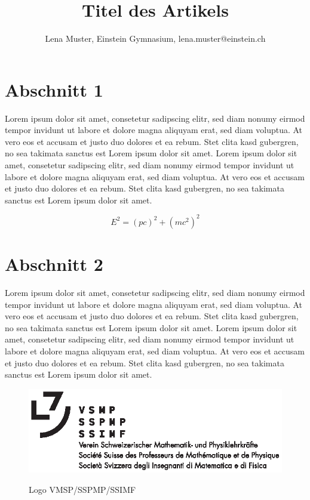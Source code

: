 \documentclass[11pt,a4paper]{article} %
\title{{\sffamily\bfseries Titel des Artikels}} %
\author{{\sffamily Lena Muster, Einstein Gymnasium, lena.muster@einstein.ch}} %
\date{} %
\makeatletter
\renewcommand{\maketitle}{\bgroup\setlength{\parindent}{0pt}
\begin{flushleft}
  \LARGE\textbf{\@title}

  \large\@author
\end{flushleft}\egroup
}
\makeatother
\begin{document}


\clearpage\maketitle %
\thispagestyle{empty}

\section{Abschnitt 1}

Lorem ipsum dolor sit amet, consetetur sadipscing elitr, sed diam nonumy eirmod tempor invidunt ut labore et dolore magna aliquyam erat, sed diam voluptua. At vero eos et accusam et justo duo dolores et ea rebum. Stet clita kasd gubergren, no sea takimata sanctus est Lorem ipsum dolor sit amet. Lorem ipsum dolor sit amet, consetetur sadipscing elitr, sed diam nonumy eirmod tempor invidunt ut labore et dolore magna aliquyam erat, sed diam voluptua. At vero eos et accusam et justo duo dolores et ea rebum. Stet clita kasd gubergren, no sea takimata sanctus est Lorem ipsum dolor sit amet.

\begin{equation}
E^2 = \left(p c\right)^2+\left(m c^2\right)^2
\end{equation}

\section{Abschnitt 2}

Lorem ipsum dolor sit amet, consetetur sadipscing elitr, sed diam nonumy eirmod tempor invidunt ut labore et dolore magna aliquyam erat, sed diam voluptua. At vero eos et accusam et justo duo dolores et ea rebum. Stet clita kasd gubergren, no sea takimata sanctus est Lorem ipsum dolor sit amet. Lorem ipsum dolor sit amet, consetetur sadipscing elitr, sed diam nonumy eirmod tempor invidunt ut labore et dolore magna aliquyam erat, sed diam voluptua. At vero eos et accusam et justo duo dolores et ea rebum. Stet clita kasd gubergren, no sea takimata sanctus est Lorem ipsum dolor sit amet. 

\begin{figure}[H]
\includegraphics{vsmp_sspmp_ssimf.eps}
\label{fig:logo}
\caption{Logo VMSP/SSPMP/SSIMF \cite{vsmp,sspmp,ssimf}}
\end{figure}
\end{document}
